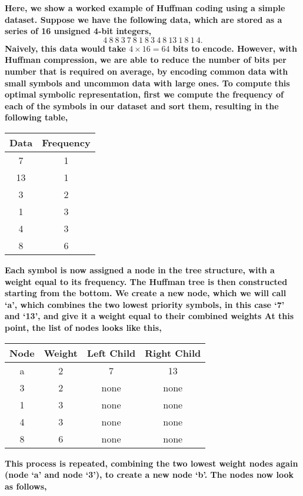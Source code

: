 \documentclass[twocolumn]{aa}
\begin{document}
\textbf{Here, we show a worked example of Huffman coding using a simple dataset. Suppose we have the following data, which are stored as a series of 16 unsigned 4-bit integers,}
\begin{equation}
4\ 8\ 8\ 3\ 7\ 8\ 1\ 8\ 3\ 4\ 8\ 13\ 1\ 8\ 1\ 4.
\label{eq:data}
\end{equation}
\textbf{Naively, this data would take $4\times 16 = 64$ bits to encode. However, with Huffman compression, we are able to reduce the number of bits per number that is required on average, by encoding common data with small symbols and uncommon data with large ones. To compute this optimal symbolic representation, first we compute the frequency of each of the symbols in our dataset and sort them, resulting in the following table,}
\begin{table}[H]
\centering
\begin{tabular}{| c | c |}
\hline
Data & Frequency\\
\hline
7 & 1\\
13 & 1\\
3 & 2\\
1 & 3\\
4 & 3\\
8 & 6\\
\hline
\end{tabular}
\end{table}
\textbf{Each symbol is now assigned a node in the tree structure, with a weight equal to its frequency. The Huffman tree is then constructed starting from the bottom. We create a new node, which we will call `a', which combines the two lowest priority symbols, in this case `7' and `13', and give it a weight equal to their combined weights At this point, the list of nodes looks like this,}
\begin{table}[H]
\centering
\begin{tabular}{| c | c | c | c |}
\hline
Node & Weight & Left Child & Right Child\\
\hline
a & 2 & 7 & 13\\
3 & 2 & none & none\\
1 & 3 & none & none\\
4 & 3 & none & none\\
8 & 6 & none & none\\
\hline
\end{tabular}
\end{table}
\textbf{This process is repeated, combining the two lowest weight nodes again (node `a' and  node `3'), to create a new node `b'. The nodes now look as follows,}
\end{document}
